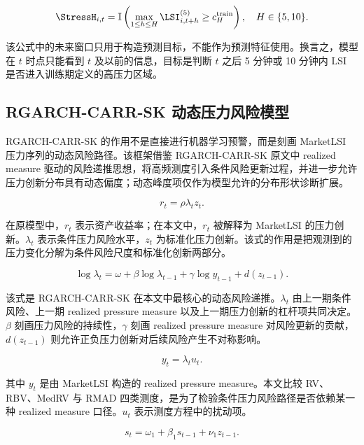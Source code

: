 \begin{equation}
\StressH_{i,t}
=
\mathbb{I}
\left(
\max_{1\leq h\leq H} \LSI^{(5)}_{i,t+h}
\geq c^{\mathrm{train}}_H
\right),
\quad H\in\{5,10\}.
\end{equation}

该公式中的未来窗口只用于构造预测目标，不能作为预测特征使用。换言之，模型在 $t$ 时点只能看到 $t$ 及以前的信息，目标是判断 $t$ 之后 5 分钟或 10 分钟内 LSI 是否进入训练期定义的高压力区域。

\subsection{RGARCH-CARR-SK 动态压力风险模型}

RGARCH-CARR-SK 的作用不是直接进行机器学习预警，而是刻画 MarketLSI 压力序列的动态风险路径。该框架借鉴 RGARCH-CARR-SK 原文中 realized measure 驱动的风险递推思想，将高频测度引入条件风险更新过程，并进一步允许压力创新分布具有动态偏度；动态峰度项仅作为模型允许的分布形状诊断扩展。

\begin{equation}
r_t=\rho\lambda_t z_t.
\end{equation}

在原模型中，$r_t$ 表示资产收益率；在本文中，$r_t$ 被解释为 MarketLSI 的压力创新。$\lambda_t$ 表示条件压力风险水平，$z_t$ 为标准化压力创新。该式的作用是把观测到的压力变化分解为条件风险尺度和标准化创新两部分。

\begin{equation}
\log \lambda_t
=
\omega
+
\beta \log \lambda_{t-1}
+
\gamma \log y_{t-1}
+
d(z_{t-1}).
\end{equation}

该式是 RGARCH-CARR-SK 在本文中最核心的动态风险递推。$\lambda_t$ 由上一期条件风险、上一期 realized pressure measure 以及上一期压力创新的杠杆项共同决定。$\beta$ 刻画压力风险的持续性，$\gamma$ 刻画 realized pressure measure 对风险更新的贡献，$d(z_{t-1})$ 则允许正负压力创新对后续风险产生不对称影响。

\begin{equation}
y_t=\lambda_t u_t.
\end{equation}

其中 $y_t$ 是由 MarketLSI 构造的 realized pressure measure。本文比较 RV、RBV、MedRV 与 RMAD 四类测度，是为了检验条件压力风险路径是否依赖某一种 realized measure 口径。$u_t$ 表示测度方程中的扰动项。

\begin{equation}
s_t=\omega_1+\beta_1s_{t-1}+\nu_1 z_{t-1}.
\end{equation}

